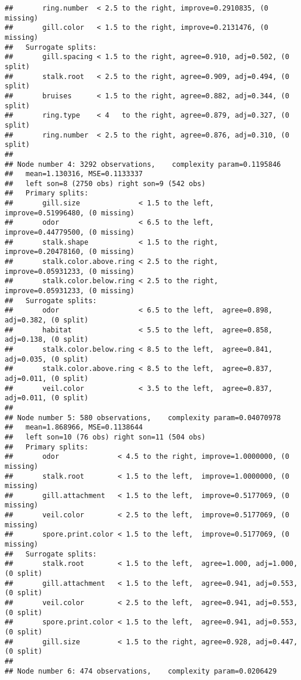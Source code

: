 \documentclass[
]{article}
\begin{document}
\begin{verbatim}
##       ring.number  < 2.5 to the right, improve=0.2910835, (0 missing)
##       gill.color   < 1.5 to the right, improve=0.2131476, (0 missing)
##   Surrogate splits:
##       gill.spacing < 1.5 to the right, agree=0.910, adj=0.502, (0 split)
##       stalk.root   < 2.5 to the right, agree=0.909, adj=0.494, (0 split)
##       bruises      < 1.5 to the right, agree=0.882, adj=0.344, (0 split)
##       ring.type    < 4   to the right, agree=0.879, adj=0.327, (0 split)
##       ring.number  < 2.5 to the right, agree=0.876, adj=0.310, (0 split)
## 
## Node number 4: 3292 observations,    complexity param=0.1195846
##   mean=1.130316, MSE=0.1133337 
##   left son=8 (2750 obs) right son=9 (542 obs)
##   Primary splits:
##       gill.size              < 1.5 to the left,  improve=0.51996480, (0 missing)
##       odor                   < 6.5 to the left,  improve=0.44779500, (0 missing)
##       stalk.shape            < 1.5 to the right, improve=0.20478160, (0 missing)
##       stalk.color.above.ring < 2.5 to the right, improve=0.05931233, (0 missing)
##       stalk.color.below.ring < 2.5 to the right, improve=0.05931233, (0 missing)
##   Surrogate splits:
##       odor                   < 6.5 to the left,  agree=0.898, adj=0.382, (0 split)
##       habitat                < 5.5 to the left,  agree=0.858, adj=0.138, (0 split)
##       stalk.color.below.ring < 8.5 to the left,  agree=0.841, adj=0.035, (0 split)
##       stalk.color.above.ring < 8.5 to the left,  agree=0.837, adj=0.011, (0 split)
##       veil.color             < 3.5 to the left,  agree=0.837, adj=0.011, (0 split)
## 
## Node number 5: 580 observations,    complexity param=0.04070978
##   mean=1.868966, MSE=0.1138644 
##   left son=10 (76 obs) right son=11 (504 obs)
##   Primary splits:
##       odor              < 4.5 to the right, improve=1.0000000, (0 missing)
##       stalk.root        < 1.5 to the left,  improve=1.0000000, (0 missing)
##       gill.attachment   < 1.5 to the left,  improve=0.5177069, (0 missing)
##       veil.color        < 2.5 to the left,  improve=0.5177069, (0 missing)
##       spore.print.color < 1.5 to the left,  improve=0.5177069, (0 missing)
##   Surrogate splits:
##       stalk.root        < 1.5 to the left,  agree=1.000, adj=1.000, (0 split)
##       gill.attachment   < 1.5 to the left,  agree=0.941, adj=0.553, (0 split)
##       veil.color        < 2.5 to the left,  agree=0.941, adj=0.553, (0 split)
##       spore.print.color < 1.5 to the left,  agree=0.941, adj=0.553, (0 split)
##       gill.size         < 1.5 to the right, agree=0.928, adj=0.447, (0 split)
## 
## Node number 6: 474 observations,    complexity param=0.0206429

\end{verbatim}
\end{document}
